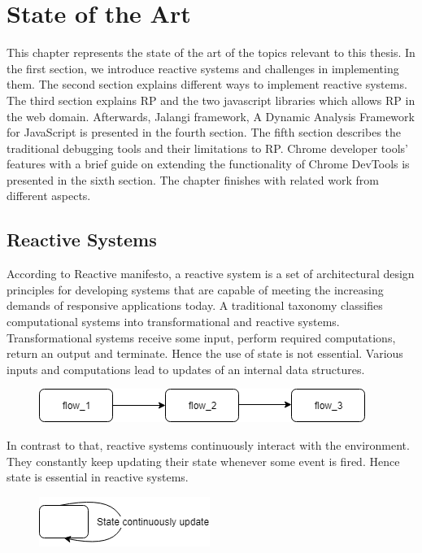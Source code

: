 \chapter{State of the Art} \label{chap:State of the Art}

This chapter represents the state of the art of the topics relevant to this thesis. In the first section, we introduce reactive systems and challenges in implementing them. The second section explains different ways to implement reactive systems. The third section explains RP and the two javascript libraries which allows RP in the web domain. Afterwards, Jalangi framework, A Dynamic Analysis Framework for JavaScript is presented in the fourth section. The fifth section describes the traditional debugging tools and their limitations to RP. Chrome developer tools' features with a brief guide on extending the functionality of Chrome DevTools is presented in the sixth section. The chapter finishes with related work from different aspects.

\section{Reactive Systems}
According to Reactive manifesto\cite{reactiveManifesto}, a reactive system is a set of architectural design principles for developing systems that are capable of meeting the increasing demands of responsive applications today. A traditional taxonomy classifies computational systems into transformational and reactive systems. Transformational systems receive some input, perform required computations, return an output and terminate. Hence the use of state is not essential. Various inputs and computations lead to updates of an internal data structures.

\begin{figure}[!h]
	\centering
	\includegraphics[scale=0.5,trim=0 0 0 0]{images/transformational-systems.png}
	\label{fig:transformational-systems}
\end{figure}

In contrast to that, reactive systems continuously interact with the environment. They constantly keep updating their state whenever some event is fired. Hence state is essential in reactive systems.

\begin{figure}[!h]
	\centering
	\includegraphics[scale=0.5,trim=0 0 0 0]{images/reactive-systems.png}
	\label{fig:reactive-systems}
\end{figure}


